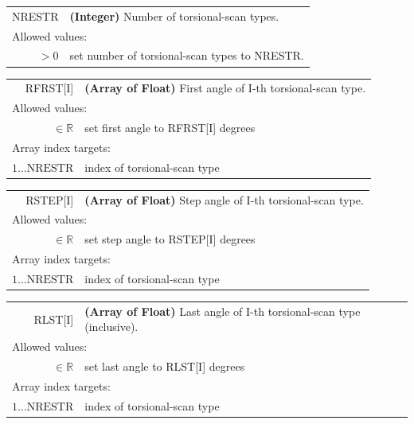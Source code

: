 \documentclass[10pt,a4paper,openany]{memoir}
\numberwithin{equation}{section}
\begin{document}
{
\begin{tabular}{r@{ : }l}
\label{descr:rfrst}
     NRESTR&\textbf{(Integer)} Number of torsional-scan types.                \\ 
\multicolumn{2}{l}{Allowed values:} \\ 
\(>0\)& set number of torsional-scan types to NRESTR.\\ 
\end{tabular}
\vspace{1ex}
}


{
\begin{tabular}{r@{ : }l}
\label{descr:rfrst}
     RFRST[I]&\textbf{(Array of Float)} First angle of I-th torsional-scan type.                                                                \\ 
\multicolumn{2}{l}{Allowed values:} \\ 
\(\in\mathbb{R}\)&set first angle to RFRST[I] degrees                                                                  \\ 
\multicolumn{2}{l}{Array index targets:} \\ 
\(1\ldots \text{NRESTR} \)& index of torsional-scan type \\
\end{tabular}
\vspace{1ex}
}

{
\begin{tabular}{r@{ : }l}
\label{descr:rstep}
     RSTEP[I]&\textbf{(Array of Float)} Step angle of I-th torsional-scan type.                                                                    \\ 
\multicolumn{2}{l}{Allowed values:} \\ 
\(\in\mathbb{R}\)&set step angle to RSTEP[I] degrees                                                                      \\ 
\multicolumn{2}{l}{Array index targets:} \\ 
\(1 \ldots \text{NRESTR} \)&index of torsional-scan type                                                                      \\ 
\end{tabular}
\vspace{1ex}
}

{
\begin{tabular}{r@{ : }l}
\label{descr:rlst}
      RLST[I]&\textbf{(Array of Float)} Last angle of I-th torsional-scan type (inclusive).                                                        \\ 
\multicolumn{2}{l}{Allowed values:} \\ 
\(\in\mathbb{R}\)&set last angle to RLST[I] degrees                                                                       \\ 
\multicolumn{2}{l}{Array index targets:} \\ 
\(1 \ldots \text{NRESTR} \)&index of torsional-scan type                                                                      \\ 
\end{tabular}
\vspace{1ex}
}
\end{document}
